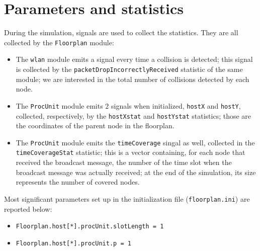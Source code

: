 \section{Parameters and statistics}
During the simulation, signals are used to collect the statistics. They are all
collected by the \texttt{Floorplan} module:
\begin{itemize}
    \item The \texttt{wlan} module emits a signal every time a collision is
    detected; this signal is collected by the
    \texttt{packetDropIncorrectlyReceived} statistic of the same module; we are
    interested in the total number of collisions detected by each node.
    \item The \texttt{ProcUnit} module emits $2$ signals when initialized,
    \texttt{hostX} and \texttt{hostY}, collected, respectively, by the
    \texttt{hostXstat} and \texttt{hostYstat} statistics; those are the
    coordinates of the parent node in the floorplan.
    \item The \texttt{ProcUnit} module emits the \texttt{timeCoverage} singal as
    well, collected in the \texttt{timeCoverageStat} statistic; this is a
    vector containing, for each node that received the broadcast message, the
    number of the time slot when the broadcast message was actually received; at
    the end of the simulation, its size represents the number of covered nodes.
\end{itemize}
Most significant parameters set up in the initialization file
(\texttt{floorplan.ini}) are reported below:
\begin{itemize}
    \item \texttt{Floorplan.host[*].procUnit.slotLength = 1}
    \item \texttt{Floorplan.host[*].procUnit.p = 1}
\end{itemize}
